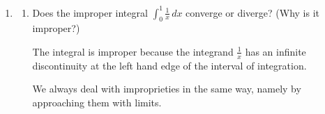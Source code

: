 \documentclass[main]{subfiles}
\begin{document}
\begin{enumerate}
        \begin{problem}[1.25in]
        Does the improper integral $\displaystyle \int_0^\infty \sin x~dx$
        converge or diverge?  If it converges, what is its value?  How about
        $\displaystyle \int_{-\infty}^0 \sin x~dx$?
        \end{problem}

        \begin{solution}
        By definition, we compute the improper integral $\displaystyle
        \int_0^\infty \sin x~dx$ as a limit of definite integrals:
        \begin{align*}
        \int_0^\infty \sin x~dx & = \lim_{b \to \infty} \left( \int_0^b
        \sin x~dx \right) \\
        & = \lim_{b \to \infty} \left( - \cos x \Big|_0^b \right) \\
        & = \lim_{b \to \infty} (- \cos b + 1)
        \end{align*}
        This limit does not exist, so the improper integral .
        Similarly, we can compute $\displaystyle \int_{-\infty}^0 \sin x~dx$
        as a limit of definite integrals:
        \begin{align*}
        \int_{-\infty}^0 \sin x~dx &= \lim_{a \to -\infty} \left( \int_a^0
        \sin x~dx \right) \\
        &= \lim_{a \to -\infty} \left( -\cos x \Big|_a^0 \right) \\
        &= \lim_{a \to -\infty} (-1 + \cos a)
        \end{align*}
        This limit does not exist, so this improper integral also
        . 
        \end{solution}

\pspace{\newpage}

  \item
  \begin{enumerate}
    \item 
  \begin{problem}
    Does the improper integral $\displaystyle \int_0^1 \frac{1}{x} \,dx$ converge or diverge?  (Why is it improper?)
  \end{problem}
  \probonly{\vfill}

  \begin{solution}
      The integral is improper because the integrand $\frac{1}{x}$ has an infinite discontinuity at the left hand edge of the interval of integration.

      We always deal with improprieties in the same way, namely by approaching them with limits.


\end{solution}
\end{enumerate}
\end{enumerate}
\end{document}
